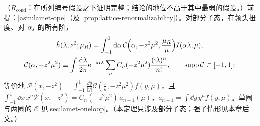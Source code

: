 \begin{theorem}\label{thm:lamet-coordinate}
（$R_{\mathrm{cond}}$：在所列编号假设之下证明完整；结论的地位不高于其中最弱的假设。）前提：\cref{asm:lamet-ope}（及 \cref{prop:lattice-renormalizability}）。对部分子态，在领头扭度、对 $\alpha_s$ 的所有阶，
\begin{equation}\label{eq:lamet-coord-fact}
\begin{gathered}
\tilde h(\lambda,z^2;\mu_R)=\int_{-1}^1\mathrm{d}\alpha\,\mathcal C\Big(\alpha,-z^2\mu^2,\frac{\mu_R}\mu\Big)I(\alpha\lambda,\mu),\\
\mathcal C(\alpha,-z^2\mu^2)\equiv\int\frac{\mathrm{d}\lambda}{2\pi}\mathrm{e}^{-\mathrm{i}\alpha\lambda}\sum_nC_n(-z^2\mu^2)\frac{(\mathrm{i}\lambda)^n}{n!},\qquad{\rm supp}\,\mathcal C\subset[-1,1];
\end{gathered}
\end{equation}%
等价地 $\mathcal P(x,-z^2)=\int_{-1}^1\frac{\dd y}{|y|}\mathcal C(\frac xy,-z^2\mu^2)f(y,\mu)$，且 $\int_{-1}^1\dd x\,x^n\mathcal P(x,-z^2)=C_n(-z^2\mu^2)\,a_{n+1}(\mu)$，$a_{n+1}=\int\dd y\,y^nf(y,\mu)$。单圈与两圈的 $\mathcal C$ 见\cref{sec:lamet-oneloop}。（本定理只涉及部分子态；强子情形见本章后文。）
\end{theorem}

